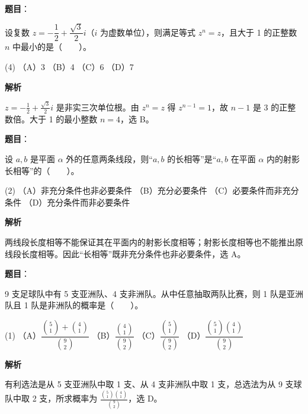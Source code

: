 \begin{answer}

\textbf{题目}：

设复数 \(z=-\dfrac12+\dfrac{\sqrt3}{2}i\)（\(i\) 为虚数单位），则满足等式 \(z^n=z\)，且大于 1 的正整数 \(n\) 中最小的是\mbox{（　　）}。

\begin{gkopts}(4)
\task （A）3
\task （B）4
\task （C）6
\task （D）7
\end{gkopts}

\textbf{解析}

\(z=-\frac12+\frac{\sqrt3}{2}i\) 是非实三次单位根。由 \(z^n=z\) 得 \(z^{n-1}=1\)，故 \(n-1\) 是 3 的正整数倍。大于 1 的最小整数 \(n=4\)，选 B。


\end{answer}
\begin{answer}

\textbf{题目}：

设 \(a,b\) 是平面 \(\alpha\) 外的任意两条线段，则“\(a,b\) 的长相等”是“\(a,b\) 在平面 \(\alpha\) 内的射影长相等”的\mbox{（　　）}。

\begin{gkopts}(2)
\task （A）非充分条件也非必要条件
\task （B）充分必要条件
\task （C）必要条件而非充分条件
\task （D）充分条件而非必要条件
\end{gkopts}

\textbf{解析}

两线段长度相等不能保证其在平面内的射影长度相等；射影长度相等也不能推出原线段长度相等。因此“长相等”既非充分条件也非必要条件，选 A。


\end{answer}
\begin{answer}

\textbf{题目}：

9 支足球队中有 5 支亚洲队、4 支非洲队。从中任意抽取两队比赛，则 1 队是亚洲队且 1 队是非洲队的概率是\mbox{（　　）}。

\begin{gkopts}(1)
\task （A）\(\dfrac{\binom51+\binom41}{\binom92}\)
\task （B）\(\dfrac{\binom41}{\binom92}\)
\task （C）\(\dfrac{\binom51}{\binom92}\)
\task （D）\(\dfrac{\binom51\binom41}{\binom92}\)
\end{gkopts}

\textbf{解析}

有利选法是从 5 支亚洲队中取 1 支、从 4 支非洲队中取 1 支，总选法为从 9 支球队中取 2 支，所求概率为 \(\frac{\binom51\binom41}{\binom92}\)，选 D。


\end{answer}
